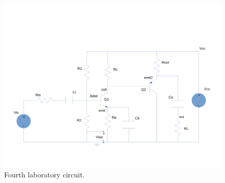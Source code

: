 \begin{figure}[h] \centering
\includegraphics[width=0.8\linewidth]{circuit.pdf}
\caption{Fourth laboratory circuit.}
\label{fig:circuit}
\end{figure}

